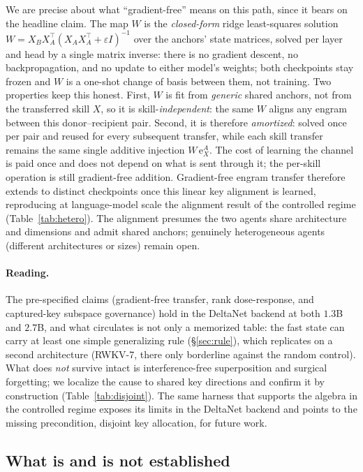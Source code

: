 \documentclass[11pt]{article}
\theoremstyle{definition}
\begin{document}
We are precise about what ``gradient-free'' means on this path, since it bears on the headline claim. The map $W$ is the \emph{closed-form} ridge least-squares solution $W = X_B X_A^\top (X_A X_A^\top + \varepsilon I)^{-1}$ over the anchors' state matrices, solved per layer and head by a single matrix inverse: there is no gradient descent, no backpropagation, and no update to either model's weights; both checkpoints stay frozen and $W$ is a one-shot change of basis between them, not training. Two properties keep this honest. First, $W$ is fit from \emph{generic} shared anchors, not from the transferred skill $X$, so it is skill-\emph{independent}: the same $W$ aligns any engram between this donor--recipient pair. Second, it is therefore \emph{amortized}: solved once per pair and reused for every subsequent transfer, while each skill transfer remains the same single additive injection $W\,\mathrm{e}_X^A$. The cost of learning the channel is paid once and does not depend on what is sent through it; the per-skill operation is still gradient-free addition. Gradient-free engram transfer therefore extends to distinct checkpoints once this linear key alignment is learned, reproducing at language-model scale the alignment result of the controlled regime (Table~\ref{tab:hetero}). The alignment presumes the two agents share architecture and dimensions and admit shared anchors; genuinely heterogeneous agents (different architectures or sizes) remain open.

\paragraph{Reading.}
The pre-specified claims (gradient-free transfer, rank dose-response, and captured-key subspace governance) hold in the DeltaNet backend at both $1.3$B and $2.7$B, and what circulates is not only a memorized table: the fast state can carry at least one simple generalizing rule (\S\ref{sec:rule}), which replicates on a second architecture (RWKV-7, there only borderline against the random control). What does \emph{not} survive intact is interference-free superposition and surgical forgetting; we localize the cause to shared key directions and confirm it by construction (Table~\ref{tab:disjoint}). The same harness that supports the algebra in the controlled regime exposes its limits in the DeltaNet backend and points to the missing precondition, disjoint key allocation, for future work.

\subsection{What is and is not established}
\end{document}
